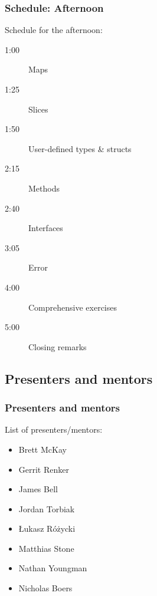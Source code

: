 \begin{frame}[t]
  \frametitle{Schedule: Afternoon}

  Schedule for the afternoon:

  \begin{description}
  \item[1:00] Maps
  \item[1:25] Slices
  \item[1:50] User-defined types \& structs
  \item[2:15] Methods
  \item[2:40] Interfaces
  \item[3:05] Error
  \item[4:00] Comprehensive exercises
  \item[5:00] Closing remarks
  \end{description}
\end{frame}

\subsection{Presenters and mentors}

\begin{frame}[t]
  \frametitle{Presenters and mentors}

  List of presenters/mentors:

  \begin{itemize}
  \item Brett McKay
  \item Gerrit Renker
  \item James Bell
  \item Jordan Torbiak
  \item Łukasz Różycki
  \item Matthias Stone
  \item Nathan Youngman
  \item Nicholas Boers
  \end{itemize}
\end{frame}


